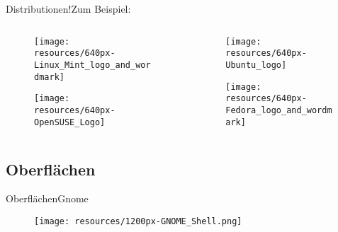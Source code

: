 \begin{frame}{Distributionen!}{Zum Beispiel:}
\begin{columns}
\begin{column}{0.5\textwidth}
	\begin{figure}
		\texttt{[image: resources/640px-Linux\_Mint\_logo\_and\_wordmark]}
	\end{figure}
	
	\begin{figure}
		\texttt{[image: resources/640px-OpenSUSE\_Logo]}
	\end{figure}
	
\end{column}
\begin{column}{0.5\textwidth}
	
	\begin{figure}
		\texttt{[image: resources/640px-Ubuntu\_logo]}
	\end{figure}
	
	\begin{figure}
		\texttt{[image: resources/640px-Fedora\_logo\_and\_wordmark]}
	\end{figure}
	
\end{column}
\end{columns}
\end{frame}

\subsection{Oberflächen}
\begin{frame}{Oberflächen}{Gnome}
\begin{figure}
\texttt{[image: resources/1200px-GNOME\_Shell.png]}
\end{figure}

\end{frame}

